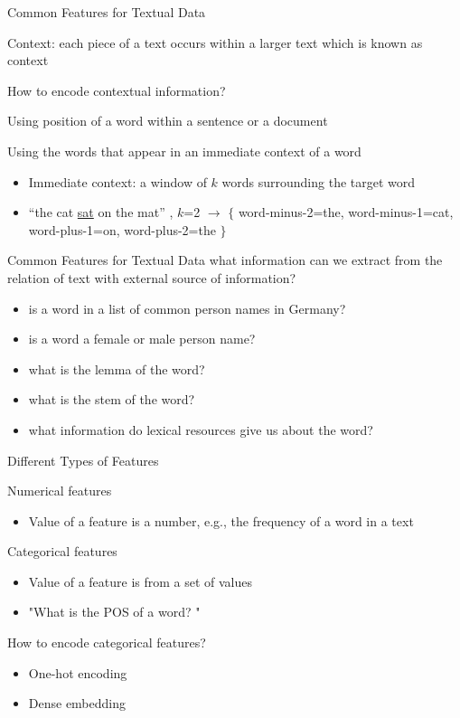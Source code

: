 \documentclass[12pt, handout]{beamer}
\begin{document}
\begin{frame}{Common Features for Textual Data}

Context: each piece of a text occurs within a larger text which is known as context

How to encode contextual information?

Using position of a word within a sentence or a document

Using the words that appear in an immediate context of a word

\begin{itemize}
	\item Immediate context: a window of $k$ words surrounding the target word
	\item ``the cat \underline{sat} on the mat'' , $k$=2 $\rightarrow$ $\{$ word-minus-2=the, word-minus-1=cat, word-plus-1=on, word-plus-2=the $\}$
\end{itemize}

\end{frame}
\begin{frame}{Common Features for Textual Data}
	what information can we extract from the relation of text with external source of information?
	\begin{itemize}
		\item is a word in a list of common person names in Germany? 
		\item is a word a female or male person name?
		\item what is the lemma of the word?
		\item what is the stem of the word?
		\item what information do lexical resources give us about the word?
	\end{itemize}
\end{frame}



\begin{frame}{Different Types of Features}

Numerical features 
		\begin{itemize}
			\item Value of a feature is a number, e.g., the frequency of a word in a text
		\end{itemize}
	
Categorical features

		\begin{itemize}
			\item Value of a feature is from a set of values
			\item "What is the POS of a word? "
		\end{itemize}
		
How to encode categorical features?

		\begin{itemize}
			\item One-hot encoding
			\item Dense embedding
		\end{itemize}
		
\end{frame}
\end{document}
